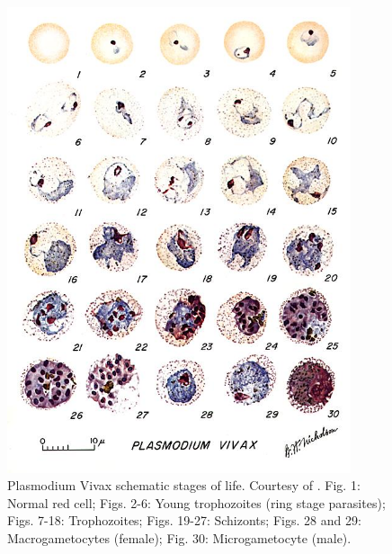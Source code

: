 \begin{figure}[!htbp]
	\centering
	\includegraphics[width=0.90\textwidth]{images/malaria_th/mal_viv}
	\caption[Plasmodium Vivax's stages.]{\label{fig:vivax_th} Plasmodium Vivax schematic stages of life. Courtesy of \cite{Med_cdc}.
		Fig. 1: Normal red cell; Figs. 2-6: Young trophozoites (ring stage parasites); Figs. 7-18: Trophozoites; Figs. 19-27: Schizonts; Figs. 28 and 29: Macrogametocytes (female); Fig. 30: Microgametocyte (male).}
\end{figure}